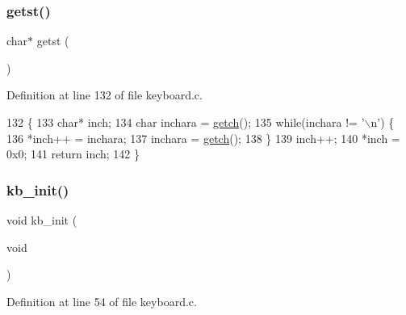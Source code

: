 \subsubsection{\texorpdfstring{getst()}{getst()}}
{\footnotesize\ttfamily char$\ast$ getst (\begin{DoxyParamCaption}{ }\end{DoxyParamCaption})}



Definition at line 132 of file keyboard.\+c.


\begin{DoxyCode}
132               \{
133     \textcolor{keywordtype}{char}* inch;
134     \textcolor{keywordtype}{char} inchara = \hyperlink{a00029_af3facad10e05defa48d45b46eb9ebe7e_af3facad10e05defa48d45b46eb9ebe7e}{getch}();
135     \textcolor{keywordflow}{while}(inchara != \textcolor{charliteral}{'\(\backslash\)n'}) \{
136         *inch++ = inchara;
137         inchara = \hyperlink{a00029_af3facad10e05defa48d45b46eb9ebe7e_af3facad10e05defa48d45b46eb9ebe7e}{getch}();
138     \}
139     inch++;
140     *inch = 0x0;
141     \textcolor{keywordflow}{return} inch;
142 \}
\end{DoxyCode}
\mbox{\label{a00029_aabdb223e5290f3b3c07bc82d075b87d7_aabdb223e5290f3b3c07bc82d075b87d7}} 
\subsubsection{\texorpdfstring{kb\+\_\+init()}{kb\_init()}}
{\footnotesize\ttfamily void kb\+\_\+init (\begin{DoxyParamCaption}\item[{void}]{ }\end{DoxyParamCaption})}



Definition at line 54 of file keyboard.\+c.


